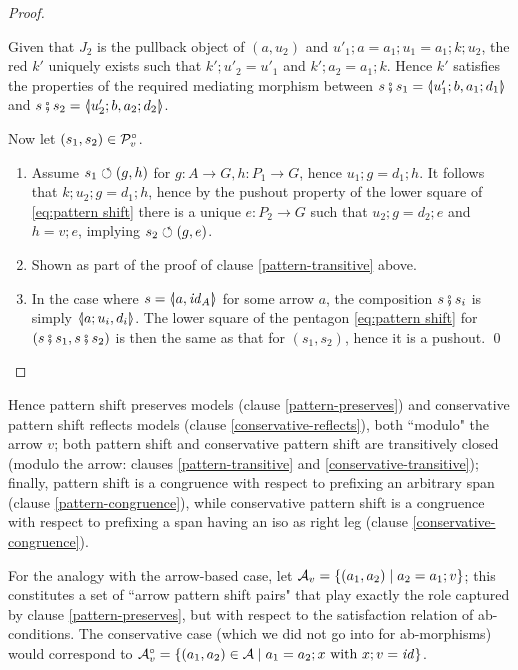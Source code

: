 \begin{fullorname}
\begin{proof}
\begin{enumerate}[topsep=\smallskipamount]
\begin{center}
\end{center}
%
Given that $J_2$ is the pullback object of $(a,u_2)$ and $u'_1;a=a_1;u_1=a_1;k;u_2$, the red $k'$ uniquely exists such that $k';u'_2=u'_1$ and $k';a_2=a_1;k$. Hence $k'$ satisfies the properties of the required mediating morphism between $s\spcomp s_1=\spanof{u'_1;b}{a_1;d_1}$ and $s\spcomp s_2=\spanof{u'_2;b}{a_2;d_2}$.
\end{enumerate}
%
Now let $(s_1,s_2)\in \mathcal{P}^\circ_v$.
%
\begin{enumerate}[resume,topsep=\smallskipamount]
\item Assume $s_1\circlearrowleft (g,h)$ for $g:A\to G,h:P_1\to G$, hence $u_1;g=d_1;h$. It follows that $k;u_2;g=d_1;h$, hence by the pushout property of the lower square of \eqref{eq:pattern shift} there is a unique $e:P_2\to G$ such that $u_2;g=d_2;e$ and $h=v;e$, implying $s_2\circlearrowleft (g,e)$.

\item Shown as part of the proof of clause \ref{pattern-transitive} above.

\item In the case where $s=\spanof{a}{\id_A}$ for some arrow $a$, the composition $s \fatsemi s_i$ is simply $\spanof{a;u_i}{d_i}$. The lower square of the pentagon \eqref{eq:pattern shift} for $(s\fatsemi s_1,s\fatsemi s_2)$ is then the same as that for $(s_1,s_2)$, hence it is a pushout.
\qed
\end{enumerate}
\end{proof}
\end{fullorname}
%
\iffull
Hence pattern shift preserves models (clause \ref{pattern-preserves}) and conservative pattern shift reflects models (clause \ref{conservative-reflects}), both ``modulo" the arrow $v$; both pattern shift and conservative pattern shift are transitively closed (modulo the arrow: clauses \ref{pattern-transitive} and \ref{conservative-transitive}); finally, pattern shift is a congruence with respect to prefixing an arbitrary span (clause \ref{pattern-congruence}), while conservative pattern shift is a congruence with respect to prefixing a span having an iso as right leg  (clause \ref{conservative-congruence}).

\fi
For the analogy with the arrow-based case, let $\mathcal{A}_v=\{{(a_1,a_2)\mid a_2=a_1;v}\}$; this constitutes a set of ``arrow pattern shift pairs" that play exactly the role captured by clause \ref{pattern-preserves}, but with respect to the satisfaction relation of ab-conditions. The conservative case (which we did not go into for ab-morphisms) would correspond to $\mathcal{A}^\circ_v=\{{(a_1,a_2)\in \mathcal{A}\mid a_1=a_2;x \text{ with } x;v=\mathit{id}}\}$.

